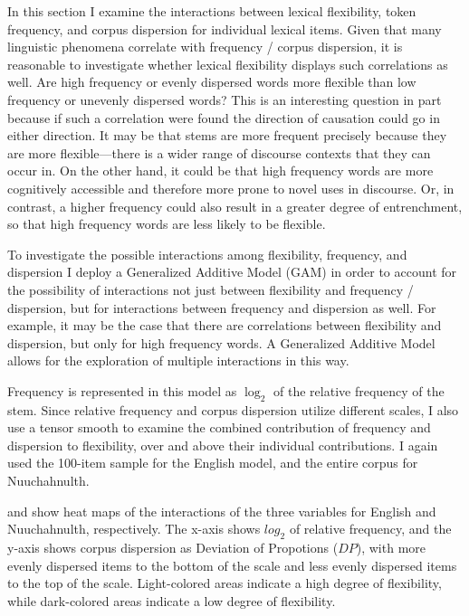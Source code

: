 In this section I examine the interactions between lexical flexibility, token frequency, and corpus dispersion for individual lexical items. Given that many linguistic phenomena correlate with frequency / corpus dispersion, it is reasonable to investigate whether lexical flexibility displays such correlations as well. Are high frequency or evenly dispersed words more flexible than low frequency or unevenly dispersed words? This is an interesting question in part because if such a correlation were found the direction of causation could go in either direction. It may be that stems are more frequent precisely because they are more flexible—there is a wider range of discourse contexts that they can occur in. On the other hand, it could be that high frequency words are more cognitively accessible and therefore more prone to novel uses in discourse. Or, in contrast, a higher frequency could also result in a greater degree of entrenchment, so that high frequency words are less likely to be flexible.

To investigate the possible interactions among flexibility, frequency, and dispersion I deploy a Generalized Additive Model (GAM) in order to account for the possibility of interactions not just between flexibility and frequency / dispersion, but for interactions between frequency and dispersion as well. For example, it may be the case that there are correlations between flexibility and dispersion, but only for high frequency words. A Generalized Additive Model allows for the exploration of multiple interactions in this way.

Frequency is represented in this model as $\log_2$ of the relative frequency of the stem. Since relative frequency and corpus dispersion utilize different scales, I also use a tensor smooth to examine the combined contribution of frequency and dispersion to flexibility, over and above their individual contributions. I again used the 100-item sample for the English model, and the entire corpus for Nuuchahnulth.

 and  show heat maps of the interactions of the three variables for English and Nuuchahnulth, respectively. The x-axis shows $log_2$ of relative frequency, and the y-axis shows corpus dispersion as Deviation of Propotions ($DP$), with more evenly dispersed items to the bottom of the scale and less evenly dispersed items to the top of the scale. Light-colored areas indicate a high degree of flexibility, while dark-colored areas indicate a low degree of flexibility.


